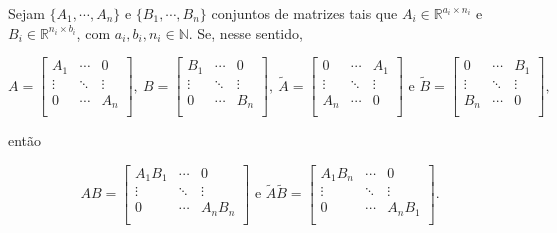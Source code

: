 \documentclass[leqno]{article}
\begin{document}
\begin{proposition} \label{mul}  
	Sejam $\{A_{1}, \cdots, A_{n}\}$ e $\{B_{1}, \cdots, B_{n}\}$ conjuntos de matrizes tais que $A_{i} \in \mathbb{R}^{a_{i} \times n_{i}}$ e $B_{i} \in \mathbb{R}^{n_{i} \times b_{i}}$, com $a_{i}, b_{i}, n_{i} \in \mathbb{N}$. Se, nesse sentido, 

	\begin{equation*} 
		A = 
		\begin{bmatrix} 
			A_{1} & \cdots & 0 \\ 
			\vdots & \ddots & \vdots \\ 
			0 & \cdots & A_{n} \\ 
		\end{bmatrix}, \  
		B = 
		\begin{bmatrix} 
			B_{1} & \cdots & 0 \\ 
			\vdots & \ddots & \vdots \\ 
			0 & \cdots & B_{n} \\ 
		\end{bmatrix}, \ 
		\tilde A = 
		\begin{bmatrix} 
			0 & \cdots & A_{1} \\ 
			\vdots & \ddots & \vdots \\ 
			A_{n} & \cdots & 0 \\ 
		\end{bmatrix} 
		\text{ e } 
		\tilde B = 
		\begin{bmatrix} 
			0 & \cdots & B_{1} \\ 
			\vdots & \ddots & \vdots \\ 
			B_{n} & \cdots & 0 \\ 
		\end{bmatrix}, 
	\end{equation*} 
	
	\noindent então 

	\begin{equation*} 
		AB = 
		\begin{bmatrix} 
			A_{1}B_{1} & \cdots & 0 \\ 
			\vdots & \ddots & \vdots \\ 
			0 & \cdots & A_{n}B_{n} \\ 
		\end{bmatrix} 
		\text{ e } 
		\tilde A \tilde B = 
		\begin{bmatrix} 
			A_{1}B_{n} & \cdots & 0 \\ 
			\vdots & \ddots & \vdots \\ 
			0 & \cdots & A_{n}B_{1} \\  
		\end{bmatrix}. 
	\end{equation*} 


\end{proposition}
\end{document}
